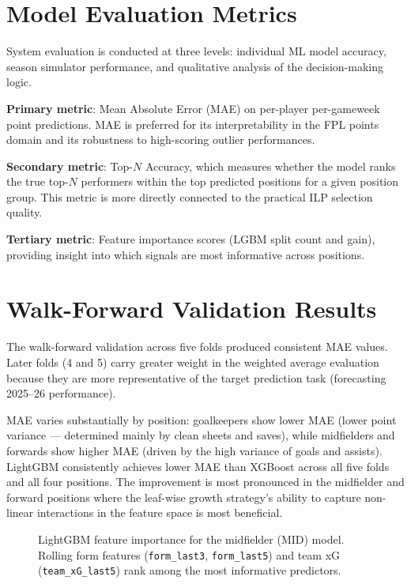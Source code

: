 
\section{Model Evaluation Metrics}

System evaluation is conducted at three levels: individual ML model accuracy, season simulator performance, and qualitative analysis of the decision-making logic.

\textbf{Primary metric}: Mean Absolute Error (MAE) on per-player per-gameweek point predictions. MAE is preferred for its interpretability in the FPL points domain and its robustness to high-scoring outlier performances.

\textbf{Secondary metric}: Top-$N$ Accuracy, which measures whether the model ranks the true top-$N$ performers within the top predicted positions for a given position group. This metric is more directly connected to the practical ILP selection quality.

\textbf{Tertiary metric}: Feature importance scores (LGBM split count and gain), providing insight into which signals are most informative across positions.

\section{Walk-Forward Validation Results}

The walk-forward validation across five folds produced consistent MAE values. Later folds (4 and 5) carry greater weight in the weighted average evaluation because they are more representative of the target prediction task (forecasting 2025--26 performance).

MAE varies substantially by position: goalkeepers show lower MAE (lower point variance — determined mainly by clean sheets and saves), while midfielders and forwards show higher MAE (driven by the high variance of goals and assists). LightGBM consistently achieves lower MAE than XGBoost across all five folds and all four positions. The improvement is most pronounced in the midfielder and forward positions where the leaf-wise growth strategy's ability to capture non-linear interactions in the feature space is most beneficial.

\begin{figure}[h]
\centering
{}
\caption{LightGBM feature importance for the midfielder (MID) model. Rolling form features (\texttt{form\_last3}, \texttt{form\_last5}) and team xG (\texttt{team\_xG\_last5}) rank among the most informative predictors.}
\label{fig:feature_importance_en}
\end{figure}

